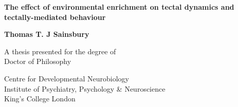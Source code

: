 \begin{titlepage}
   \begin{center}
       \vspace*{1cm}
    
       \LARGE
       \textbf{The effect of environmental enrichment on tectal dynamics and tectally-mediated behaviour}
            
       \vspace{1.5cm}
        \large
       \textbf{Thomas T. J Sainsbury}
       
       \vspace{1cm}
       
       \vspace{0.1cm}
       
       \vspace{1cm}

       \vfill
            
       A thesis presented for the degree of\\
       Doctor of Philosophy
            
       \vspace{0.8cm}

            
       Centre for Developmental Neurobiology\\
       Institute of Psychiatry, Psychology \& Neuroscience\\
       King's College London\\
            
   \end{center}
\end{titlepage}